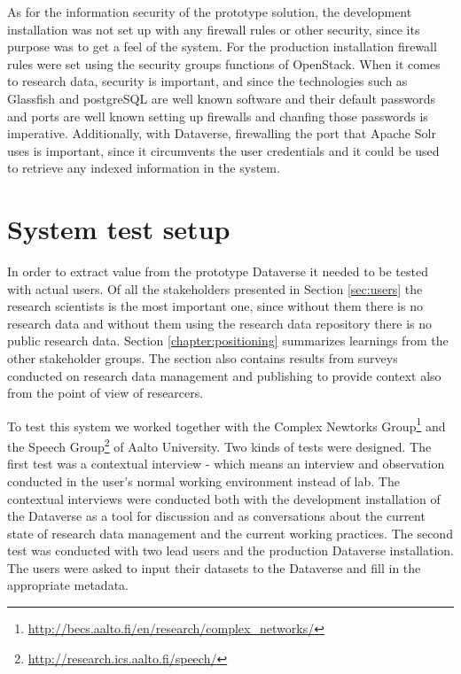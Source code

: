 As for the information security of the prototype solution, the development
installation was not set up with any firewall rules or other security, since
its purpose was to get a feel of the system. For the production installation
firewall rules were set using the security groups functions of OpenStack.
When it comes to research data, security is important, and since the
technologies such as Glassfish and postgreSQL are well known software and
their default passwords and ports are well known setting up firewalls and
chanfing those passwords is imperative. Additionally, with Dataverse,
firewalling the port that Apache Solr uses is important, since it circumvents
the user credentials and it could be used to retrieve any indexed information
in the system.

\section{System test setup}
\label{sec:system_testing}

In order to extract value from the prototype Dataverse it needed to be tested
with actual users. Of all the stakeholders presented in Section \ref{sec:users}
the research scientists is the most important one, since without them there is
no research data and without them using the research data repository there is
no public research data. Section \ref{chapter:positioning} summarizes learnings
from the other stakeholder groups. The section also contains results from
surveys conducted on research data management and publishing to provide context
also from the point of view of researcers.

To test this system we worked together with the Complex Newtorks
Group\footnote{\url{http://becs.aalto.fi/en/research/complex\_networks/}} and the
Speech Group\footnote{\url{http://research.ics.aalto.fi/speech/}} of Aalto
University. Two kinds of tests were designed. The first test was a contextual
interview - which means an interview and observation conducted in the user's normal working
environment instead of lab. The contextual interviews were conducted both with
the development installation of the Dataverse as a tool for discussion and as
conversations about the current state of research data management and the
current working practices. The second test was conducted with two lead users
and the production Dataverse installation. The users were asked to input their
datasets to the Dataverse and fill in the appropriate metadata.

